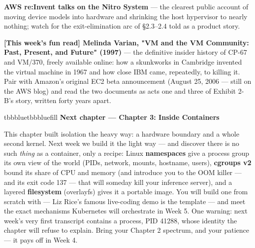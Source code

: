 \begin{tbbitemize}
  \item \textbf{AWS re:Invent talks on the Nitro System} — the clearest public account of moving device models into hardware and shrinking the host hypervisor to nearly nothing; watch for the exit-elimination arc of §2.3–2.4 told as a product story.
  \item \textbf{[This week's fun read] Melinda Varian, "VM and the VM Community: Past, Present, and Future" (1997)} — the definitive insider history of CP-67 and VM/370, freely available online: how a skunkworks in Cambridge invented the virtual machine in 1967 and how close IBM came, repeatedly, to killing it. Pair with Amazon's original EC2 beta announcement (August 25, 2006 — still on the AWS blog) and read the two documents as acts one and three of Exhibit 2-B's story, written forty years apart.
\end{tbbitemize}

\vspace{5.0pt}

\begin{calloutbox}{tbbblue}{tbbbluefill}
{\normalsize\bfseries\color{tbbblue}Next chapter — Chapter 3: Inside Containers}\par\vspace{3pt}
This chapter built isolation the heavy way: a hardware boundary and a whole second kernel. Next week we build it the light way — and discover there is no such \textit{thing} as a container, only a recipe: Linux \textbf{namespaces} give a process group its own view of the world (PIDs, network, mounts, hostname, users), \textbf{cgroups v2} bound its share of CPU and memory (and introduce you to the OOM killer — and its exit code 137 — that will someday kill your inference server), and a layered \textbf{filesystem} (overlayfs) gives it a portable image. You will build one from scratch with  — Liz Rice's famous live-coding demo is the template — and meet the exact mechanisms Kubernetes will orchestrate in Week 5. One warning: next week's very first transcript contains a process, PID 41288, whose identity the chapter will refuse to explain. Bring your Chapter 2 spectrum, and your patience — it pays off in Week 4.
\end{calloutbox}
